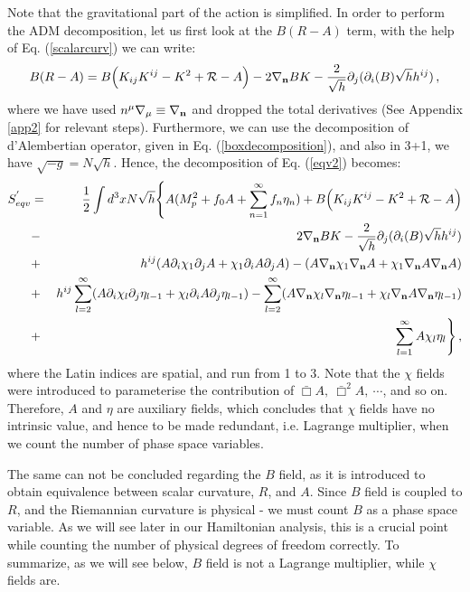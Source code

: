\documentclass[a4paper,12pt]{article}
\newcommand{\bbox}{\bar{\Box}}
\newcommand{\bn}{\bold{n}}
\newcommand{\+}{^{\dagger}}
\newcommand{\2}{\frac{1}{2}}
\newcommand{\3}{\frac{1}{3}}
\newcommand{\4}{\frac{1}{4}}
\newcommand{\6}{\frac{1}{6}}
\newcommand{\8}{\frac{1}{8}}
\begin{document}
Note that the gravitational part of the action is simplified. 
In order to perform the ADM decomposition, let us first look at the $B(R-A)$ term, with the help of Eq. (\ref{scalarcurv})
we can write:
\begin{eqnarray}\label{bra}
B(R-A)=B\Big(K_{ij}K^{ij}-K^2+\mathcal{R}-A\Big)-2\nabla_\bn BK-\frac{2}{\sqrt{h}}\partial_j(\partial_i(B)\sqrt{h}h^{ij}
)\,,\nonumber \\
\end{eqnarray}
where we have used $n^\mu\nabla_\mu\equiv\nabla_\bn$ and dropped the total derivatives (See Appendix \ref{app2} for relevant steps). 
Furthermore, we can use the decomposition of d'Alembertian operator, given in Eq. (\ref{boxdecomposition}), and also in 3+1, we have 
$\sqrt{-g}=N\sqrt{h}$. Hence, the decomposition of Eq. (\ref{eqv2}) becomes:
\begin{eqnarray}\label{finaldecomposition}
S_{eqv}^{'}&=&\frac{1}{2}\int d^{3}xN\sqrt{h}\Bigg\{A(M^{2}_{p}+f_{0}A+\sum^{\infty}_{n=1}f_n\eta_{n})+B\Big(K_{ij}K^{ij}-K^2+\mathcal{R}-A\Big)\nonumber\\
&-&2\nabla_\bn BK-\frac{2}{\sqrt{h}}\partial_j(\partial_i(B)\sqrt{h}h^{ij}
)
\nonumber\\&+&h^{ij}(A\partial_i\chi_1  \partial_j A+\chi_1
\partial_i A
\partial_j A)-(A\nabla_\bn \chi_1  \nabla_\bn A+\chi_1
\nabla_\bn A\nabla_\bn A)\nonumber\\&+&h^{ij}\sum^{\infty}_{l=2}(A\partial_i\chi_l  \partial_j\eta_{l-1}
+\chi_l
\partial_i A
\partial_j \eta_{l-1})-\sum^{\infty}_{l=2}(A\nabla_\bn \chi_l  \nabla_\bn \eta_{l-1}
+\chi_l
\nabla_\bn  A\nabla_\bn \eta_{l-1})\nonumber\\&+&\sum ^{\infty}_{l=1}A\chi_l \eta_l
\Bigg\}\,,
\end{eqnarray}
where  the Latin indices are spatial, and run from 1 to 3. Note that the $\chi$ fields were introduced to parameterise the contribution of 
$\bbox A,~\bbox^2A,~\cdots $, and so on. Therefore, $A$ and $\eta$ are auxiliary fields, which concludes that $\chi$ fields have no intrinsic value, and hence to be made redundant, i.e. Lagrange multiplier, when we count the number of phase space variables. 

The same can not be concluded regarding the $B$ field, as it is introduced to obtain equivalence between scalar curvature, $R$, and $A$. Since $B$ field is coupled to $R$, and the Riemannian curvature is physical - we must count $B$ as a phase space variable. As we will see later in our Hamiltonian analysis, this is a crucial point while counting the number of physical degrees of freedom correctly. To summarize, as we will see below, $B$ field is not a Lagrange multiplier, while $\chi$ fields are.
\end{document}
